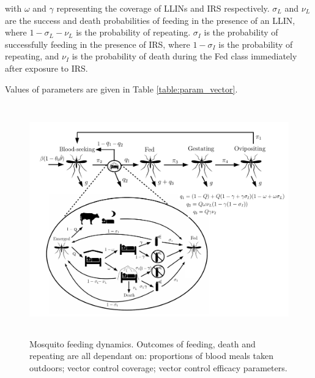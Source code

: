 with $\omega$ and $\gamma$ representing the coverage of LLINs and IRS respectively. $\sigma_L$ and $\nu_L$ are the success and death probabilities of feeding in the presence of an LLIN, where $1-\sigma_L - \nu_L$ is the probability of repeating. $\sigma_I$ is the probability of successfully feeding in the presence of IRS, where $1-\sigma_I$ is the probability of repeating, and $\nu_I$ is the probability of death during the Fed class immediately after exposure to IRS.

Values of parameters are given in Table \ref{table:param_vector}.

\begin{figure}[ht]
\begin{center}
\includegraphics[height=10cm]{Project/Figures/VectorModel/Diagram_VC2019.pdf}
\caption[Gonotrophic cycle model schematic.]{Mosquito feeding dynamics. Outcomes of feeding, death and repeating are all dependant on: proportions of blood meals taken outdoors; vector control coverage; vector control efficacy parameters.}
\label{fig:diag_vec}
\end{center}
\end{figure}

